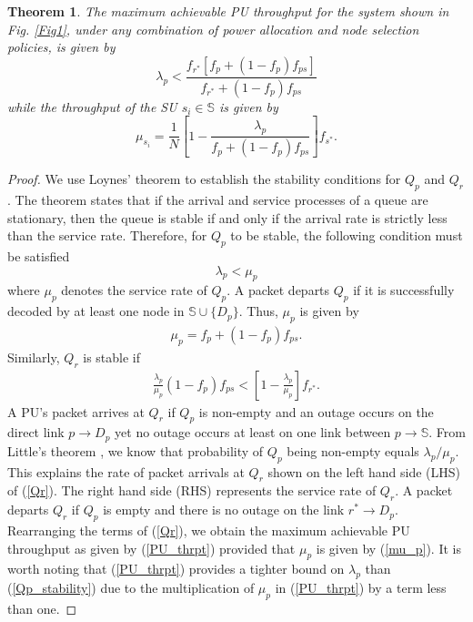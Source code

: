 \documentclass[journal,twocolumn]{IEEEtran}
\newtheorem{theorem}{Theorem}
\begin{document}
\begin{theorem}\label{Thm1}
The maximum achievable PU throughput for the system shown in Fig. \ref{Fig1}, under any combination of  power allocation and node selection
policies, is given by
\begin{equation}\label{PU_thrpt}
\lambda_{p}<\frac{f_{r^*}[f_{p}+(1-f_{p})f_{ps}]}{f_{r^*}+(1-f_{p})f_{ps}}
\end{equation}
while the throughput of the SU $s_{i} \in \mathbb{S}$ is given by
\begin{equation}\label{SUthrpt}
\mu_{s_i}=\frac{1}{N} \left[1-\frac{\lambda_p}{f_{p}+(1-f_{p})f_{ps}}\right]f_{s^*}.
\end{equation}
\end{theorem}
\begin{proof}
We use Loynes' theorem \cite{Loynes} to establish the stability conditions for $Q_{p}$ and $Q_{r}$. The theorem states that if the arrival and
service processes of a queue are stationary, then the queue is stable if and only if the arrival rate is strictly less than the service rate.
Therefore, for $Q_{p}$ to be stable, the following condition must be satisfied
\begin{equation}\label{Qp_stability}
\lambda_{p}<\mu_{p}
\end{equation}
where $\mu_{p}$ denotes the service rate of $Q_{p}$. A packet departs $Q_{p}$ if it is successfully decoded by at least one node in $\mathbb{S} \cup \{D_{p}\}$. Thus, $\mu_{p}$ is given by
\begin{align}\label{mu_p}
\mu_{p}=f_{p} + (1-f_{p})f_{ps}.
\end{align}
Similarly, $Q_{r}$ is stable if
\begin{align}\label{Qr}
\frac{\lambda_{p}}{\mu_{p}}(1-f_{p})f_{ps}<\left[ 1-\frac{\lambda_{p}}{\mu_{p}}\right]f_{r^*}.
\end{align}
A PU's packet arrives at $Q_{r}$ if $Q_{p}$ is non-empty and an outage occurs on the direct link $p \to D_p$ yet no outage occurs at least on one link between $p \rightarrow \mathbb{S}$. From Little's theorem \cite{Bertsekas}, we know that probability of $Q_{p}$ being non-empty equals
$\lambda_{p}/\mu_{p}$. This explains the rate of packet arrivals at $Q_{r}$ shown on the left hand side (LHS) of (\ref{Qr}). The right hand side (RHS) represents the service rate of $Q_{r}$. A packet departs $Q_{r}$ if $Q_{p}$ is empty and there is no outage on the link $r^* \rightarrow D_{p}$.
Rearranging the terms of (\ref{Qr}), we obtain the maximum achievable PU throughput as given by (\ref{PU_thrpt}) provided that $\mu_{p}$ is given by (\ref{mu_p}). It is worth noting that (\ref{PU_thrpt}) provides a tighter bound on $\lambda_{p}$ than (\ref{Qp_stability}) due to the
multiplication of $\mu_{p}$ in (\ref{PU_thrpt}) by a term less than one.


\end{proof}
\end{document}
